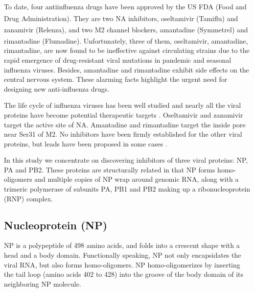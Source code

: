 To date, four antiinfluenza drugs have been approved by the US FDA (Food and Drug Administration). They are two NA inhibitors, oseltamivir (Tamiflu\textsuperscript{\textregistered}) and zanamivir (Relenza\textsuperscript{\textregistered}), and two M2 channel blockers, amantadine (Symmetrel\textsuperscript{\textregistered}) and rimantadine (Flumadine\textsuperscript{\textregistered}). Unfortunately, three of them, oseltamivir, amantadine, rimantadine, are now found to be ineffective against circulating strains due to the rapid emergence of drug-resistant viral mutations in pandemic and seasonal influenza viruses. Besides, amantadine and rimantadine exhibit side effects on the central nervous system. These alarming facts highlight the urgent need for designing new anti-influenza drugs.

The life cycle of influenza viruses has been well studied \citep{1539,1522,1559} and nearly all the viral proteins have become potential therapeutic targets \citep{1539,1519,1229}. Oseltamivir and zanamivir target the active site of NA. Amantadine and rimantadine target the inside pore near Ser31 of M2. No inhibitors have been firmly established for the other viral proteins, but leads have been proposed in some cases \citep{1229,1522}.

In this study we concentrate on discovering inhibitors of three viral proteins: NP, PA and PB2. These proteins are structurally related in that NP forms homo-oligomers and multiple copies of NP wrap around genomic RNA, along with a trimeric polymerase of subunits PA, PB1 and PB2 making up a ribonucleoprotein (RNP) complex.


\subsection{Nucleoprotein (NP)}

NP is a polypeptide of 498 amino acids, and folds into a crescent shape with a head and a body domain. Functionally speaking, NP not only encapsidates the viral RNA, but also forms homo-oligomers. NP homo-oligomerizes by inserting the tail loop (amino acids 402 to 428) into the groove of the body domain of its neighboring NP molecule.

